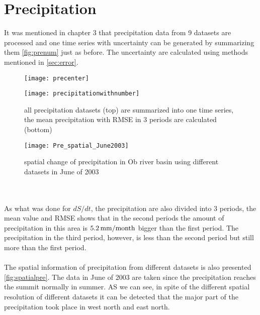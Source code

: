 \section{Precipitation}
It was mentioned in chapter 3 that precipitation data from 9 datasets are processed and one time series with uncertainty can be generated by summarizing them \autoref{fig:prenum} just as before. The uncertainty are calculated using methods mentioned in \autoref{sec:error}.
\begin{figure}[htbp]\centering
	\begin{minipage}[t]{0.9\textwidth}
		\centering
		\texttt{[image: precenter]} %
	\end{minipage}
	\begin{minipage}[t]{0.9\textwidth}
		\centering
		\texttt{[image: precipitationwithnumber]} %
	\end{minipage}
	\caption{all precipitation datasets (top) are summarized into one time series, the mean precipitation with RMSE in 3 periods are calculated (bottom)}
	\label{fig:prenum}
\end{figure}
\begin{figure}[htbp]\centering
	\centering
	\texttt{[image: Pre\_spatial\_June2003]} %
	\caption{spatial change of precipitation in Ob river basin using different datasets in June of 2003} 
	\label{fig:spatialpre}
\end{figure}\\\\
As what was done for $dS/dt$, the precipitation are also divided into 3 periods, the mean value and RMSE shows that in the second periods the amount of precipitation in this area is $5.2\,\mathrm{mm/month}$ bigger than the first period. The precipitation in the third period, however, is less than the second period but still more than the first period.\\\\
The spatial information of precipitation from different datasets is also presented \autoref{fig:spatialpre}. The data in June of 2003 are taken since the precipitation reaches the summit normally in summer. AS we can see, in spite of the different spatial resolution of different datasets it can be detected that the major part of the precipitation took place in west north and east north. 
\clearpage
